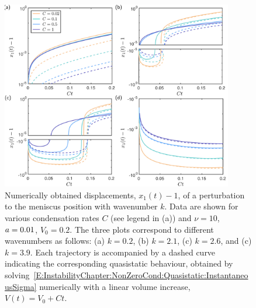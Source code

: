 \begin{figure}[t]
\centering
\includegraphics[width = 0.9\textwidth]{v2_full_numerics_traces}
\caption{Numerically obtained displacements, $x_1(t) -1$, of a perturbation to the meniscus position with wavenumber $k$. Data are shown for various condensation rates $C$ (see legend in (a)) and $\nu = 10$, $a = 0.01$, $V_0 = 0.2$. The three plots correspond to  different wavenumbers as follows: (a) $k = 0.2$, (b) $k = 2.1$, (c) $k = 2.6$, and (c) $k = 3.9$. Each trajectory is accompanied by a dashed curve indicating the corresponding quasistatic behaviour, obtained by solving~\eqref{E:InstabilityChapter:NonZeroCond:Quasistatic:InstantaneousSigma} numerically with a linear volume increase, $V(t) = V_0 + Ct$.}
\label{fig:InstabilityChapter:TimeDepBaseState:FullNumericsTraces}
\end{figure}

